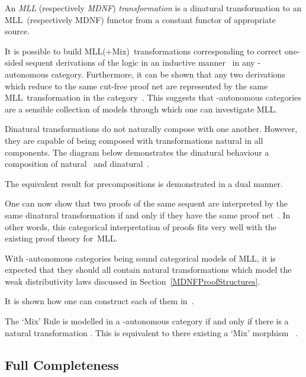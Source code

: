 \documentclass{LMCS}
\theoremstyle{plain}\newtheorem*{cLm}{Claim}
\newcommand{\mll}{MLL} \newcommand{\mall}{MALL}
\newcommand{\mllmixmaybe}{MLL(+Mix)}
\newcommand{\p}{} \newcommand{\N}{\mathbb{N}}
\newcommand{\hugh}[1]{#1}
\begin{document}
\begin{defi}
An {\em \mll} (respectively {\em MDNF}) {\em transformation}\/ is a dinatural transformation to an \mll\ (respectively MDNF)
functor from a constant functor  of appropriate source.
\end{defi}

It is possible to build \mllmixmaybe\ transformations corresponding to correct one-sided sequent derivations of the logic in an\label{SoundnessTechnique} inductive manner~\cite{Ste13} in any -autonomous category. Furthermore, it can be shown that any two derivations which reduce to the same cut-free proof net are represented by the same \mll\ transformation in the category~\cite{LS06}. This suggests that -autonomous categories are a sensible collection of models through which one can investigate \mll.

\p Dinatural transformations do not naturally compose with one another. However, they are capable of being composed with transformations natural in all components. The diagram below demonstrates the dinatural behaviour a composition of natural~ and dinatural~.

\label{DiNatsComposeStatement}

The equivalent result for precompositions is demonstrated in a dual manner.

\p One can now show that two proofs of the same sequent are interpreted
by the same dinatural transformation if and only if they have the
same proof net~\cite{LS06}. In other words, this categorical interpretation of
proofs fits very well with the existing proof theory for~\mll.

\p With -autonomous categories being sound categorical models of \mll, it is expected that they should all contain natural transformations which model the \hugh{weak distributivity} laws discussed in Section~\ref{MDNFProofStructures}.


It is shown how one can construct each of them in~\cite{Ste13}.

\p The `Mix' Rule is modelled in a -autonomous category if and only if there is a natural transformation . This is equivalent to there existing a `Mix' morphism ~\cite{Tan97}.

\subsection{Full Completeness}
\end{document}
